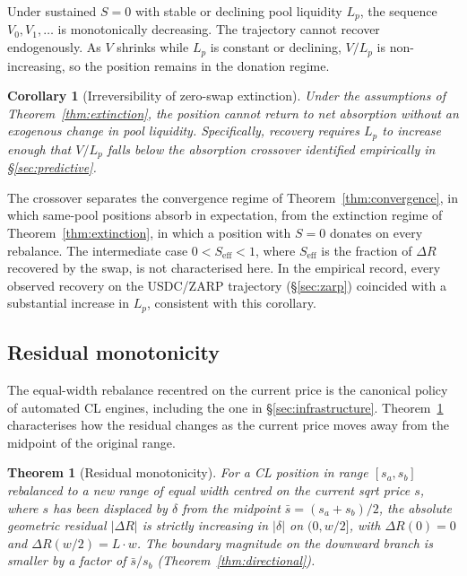 \documentclass[11pt,a4paper]{article}
\theoremstyle{plain}
\newtheorem{theorem}{Theorem}
\newtheorem{corollary}{Corollary}[theorem]
\begin{document}
\noindent Under sustained $S = 0$ with stable or declining pool liquidity $L_p$, the sequence $V_0, V_1, \ldots$ is monotonically decreasing. The trajectory cannot recover endogenously. As $V$ shrinks while $L_p$ is constant or declining, $V/L_p$ is non-increasing, so the position remains in the donation regime.

\begin{corollary}[Irreversibility of zero-swap extinction]\label{cor:irreversibility}
Under the assumptions of Theorem~\ref{thm:extinction}, the position cannot return to net absorption without an exogenous change in pool liquidity. Specifically, recovery requires $L_p$ to increase enough that $V/L_p$ falls below the absorption crossover identified empirically in \S\ref{sec:predictive}.
\end{corollary}

\noindent The crossover separates the convergence regime of Theorem~\ref{thm:convergence}, in which same-pool positions absorb in expectation, from the extinction regime of Theorem~\ref{thm:extinction}, in which a position with $S = 0$ donates on every rebalance. The intermediate case $0 < S_{\text{eff}} < 1$, where $S_{\text{eff}}$ is the fraction of $\Delta R$ recovered by the swap, is not characterised here. In the empirical record, every observed recovery on the USDC/ZARP trajectory (\S\ref{sec:zarp}) coincided with a substantial increase in $L_p$, consistent with this corollary.

\subsection{Residual monotonicity}\label{sec:monotonicity}

The equal-width rebalance recentred on the current price is the canonical policy of automated CL engines, including the one in \S\ref{sec:infrastructure}. Theorem~\ref{thm:monotonicity} characterises how the residual changes as the current price moves away from the midpoint of the original range.

\begin{theorem}[Residual monotonicity]\label{thm:monotonicity}
For a CL position in range $[s_a, s_b]$ rebalanced to a new range of equal width centred on the current sqrt price $s$, where $s$ has been displaced by $\delta$ from the midpoint $\bar{s} = (s_a + s_b)/2$, the absolute geometric residual $|\Delta R|$ is strictly increasing in $|\delta|$ on $(0, w/2]$, with $\Delta R(0) = 0$ and $\Delta R(w/2) = L \cdot w$. The boundary magnitude on the downward branch is smaller by a factor of $\bar{s}/s_b$ (Theorem~\ref{thm:directional}).
\end{theorem}
\end{document}

